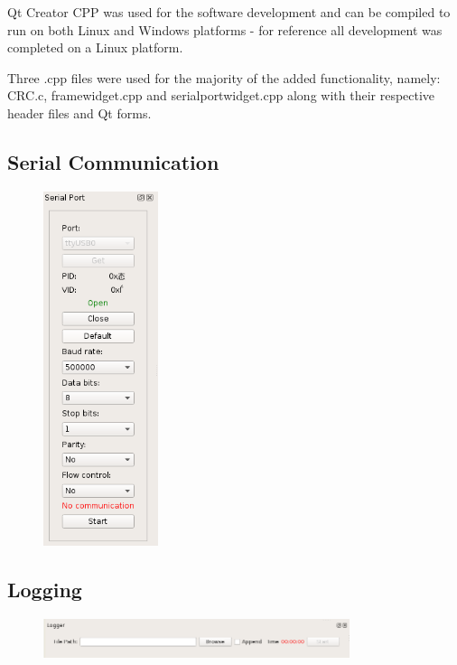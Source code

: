 Qt Creator CPP was used for the software development and can be compiled to run on both Linux and Windows platforms - for reference all development was completed on a Linux platform.

Three .cpp files were used for the majority of the added functionality, namely: CRC.c, framewidget.cpp and serialportwidget.cpp along with their respective header files and Qt forms.

\subsection{Serial Communication}

\begin{figure}
\centering
\includegraphics[width=0.3\textwidth]{images/gui/serial-port}
\end{figure}

\subsection{Logging}

\begin{figure}
\centering
\includegraphics[width=0.8\textwidth]{images/gui/logger}
\end{figure}

